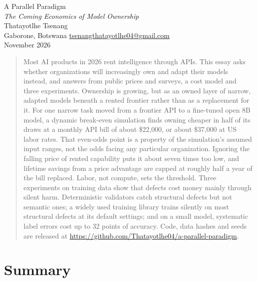 \documentclass[11pt,a4paper]{article}
\begin{document}
\thispagestyle{plain}

\begin{center}
  {\fontsize{24}{28}\selectfont A Parallel Paradigm}\\[6pt]
  {\Large\itshape The Coming Economics of Model Ownership}\\[18pt]
  {\large Thatayotlhe Tsenang}\\[3pt]
  {\small\color{muted}Gaborone, Botswana\quad
   \href{mailto:tsenangthatayotlhe04@gmail.com}{tsenangthatayotlhe04@gmail.com}}\\[3pt]
  {\small\color{muted}November 2026}
\end{center}

\vspace{8pt}
\begin{abstract}
\noindent Most AI products in 2026 rent intelligence through APIs. This essay asks whether
organizations will increasingly own and adapt their models instead, and answers from public
prices and surveys, a cost model and three experiments. Ownership is growing, but as an owned
layer of narrow, adapted models beneath a rented frontier rather than as a replacement for it.
For one narrow task moved from a frontier API to a fine-tuned open 8B model, a dynamic
break-even simulation finds owning cheaper in half of its draws at a monthly API bill of about
\$22,000, or about \$37,000 at US labor rates. That even-odds point is a property of the
simulation's assumed input ranges, not the odds facing any particular organization. Ignoring the
falling price of rented capability puts it about seven times too low, and lifetime
savings from a price advantage are capped at roughly half a year of the bill replaced. Labor,
not compute, sets the threshold. Three experiments on training data show that defects cost
money mainly through silent harm. Deterministic validators catch structural defects but not
semantic ones; a widely used training library trains silently on most structural defects at
its default settings; and on a small model, systematic label errors cost up to 32 points of
accuracy. Code, data hashes and seeds are released at
\url{https://github.com/Thatayotlhe04/a-parallel-paradigm}.
\end{abstract}

\vspace{4pt}
\begingroup
\small
\setlength{\columnsep}{2.2em}
\vspace{-0.6em}
\begin{multicols}{2}
\makeatletter{}\makeatother
\end{multicols}
\endgroup

\newpage
\section*{Summary}




\nocite{alpacacleaned,hhrlhf,parallelogram,trl}


\end{document}
